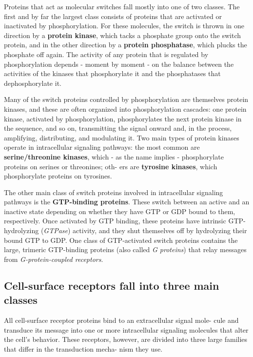Proteins that act as molecular switches fall mostly into one of two classes.
The first and by far the largest class consists of proteins that are activated
or inactivated by phosphorylation. For these molecules, the switch is thrown in
one direction by a \textbf{protein kinase}, which tacks a phosphate group onto
the switch protein, and in the other direction by a \textbf{protein phosphatase},
which plucks the phosphate off again. The activity of any protein that is regulated
by phosphorylation depends - moment by moment - on the balance between the activities 
of the kinases that phosphorylate it and the phosphatases that dephosphorylate it.

Many of the switch proteins controlled by phosphorylation are themselves
protein kinases, and these are often organized into phosphorylation cascades: 
one protein kinase, activated by phosphorylation, phosphorylates
the next protein kinase in the sequence, and so on, transmitting the signal 
onward and, in the process, amplifying, distributing, and modulating
it. Two main types of protein kinases operate in intracellular signaling
pathways: the most common are \textbf{serine/threonine kinases}, which - as
the name implies - phosphorylate proteins on serines or threonines; oth-
ers are \textbf{tyrosine kinases}, which phosphorylate proteins on tyrosines.

The other main class of switch proteins involved in intracellular signaling 
pathways is the \textbf{GTP-binding proteins}. These switch between an
active and an inactive state depending on whether they have GTP or
GDP bound to them, respectively. Once activated by GTP
binding, these proteins have intrinsic GTP-hydrolyzing (\textit{GTPase}) activity,
and they shut themselves off by hydrolyzing their bound GTP to GDP.
One class of GTP-activated switch proteins contains the large, trimeric
GTP-binding proteins (also called \textit{G proteins}) that relay messages from
\textit{G-protein-coupled receptors}.

\subsection{Cell-surface receptors fall into three main classes}

All cell-surface receptor proteins bind to an extracellular signal mole-
cule and transduce its message into one or more intracellular signaling
molecules that alter the cell’s behavior. These receptors, however, are
divided into three large families that differ in the transduction mecha-
nism they use.

